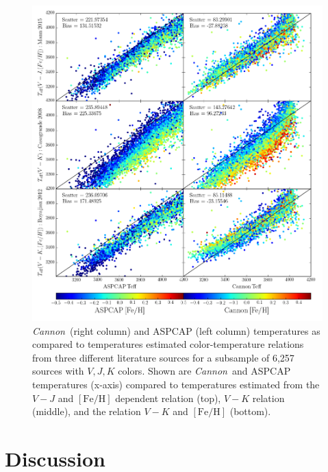 \documentclass[twocolumn]{aastex62}
\newcommand{\cannon}{\textsl{Cannon}}
\newcommand{\feh}{[{\mathrm{Fe}/\mathrm{H}}]}
\begin{document}
\begin{figure}[h]
	\includegraphics[width=\linewidth]{figures/aspcap_cannon_validation.png}
	\caption{\cannon\ (right column) and ASPCAP (left column) temperatures as compared to temperatures estimated color-temperature relations from three different literature sources for a subsample of 6,257 sources with $V,J,K$ colors. Shown are \cannon\ and ASPCAP temperatures (x-axis) compared to temperatures estimated from the \citealt{Mann:2015} $V-J$ and $\feh$ dependent relation (top), \citealt{Casagrande:2008} $V-K$ relation (middle), and the \citealt{Boyajian:2012} relation $V-K$ and $\feh$ (bottom).}
	\label{fig:teff_comparisons}
\end{figure}

\section{Discussion} \label{sec:discussion}
\end{document}
